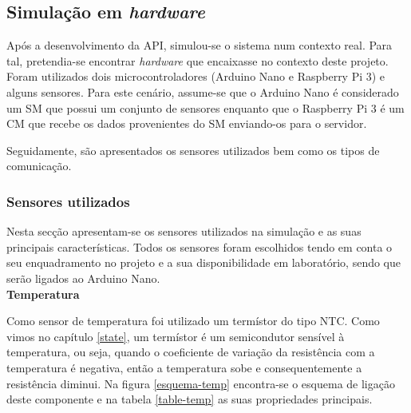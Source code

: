 \newpage
\subsection{Simulação em \textit{hardware}}
\label{arq-hardw}


Após a desenvolvimento da API, simulou-se o sistema num contexto real. Para tal, pretendia-se encontrar \textit{hardware} que encaixasse no contexto deste projeto. Foram utilizados dois microcontroladores (Arduino Nano e Raspberry Pi 3) e alguns sensores. Para este cenário, assume-se que o Arduino Nano é considerado um \acl{SM} que possui um conjunto de sensores enquanto que o Raspberry Pi 3 é um \acl{CM} que recebe os dados provenientes do \acl{SM} enviando-os para o servidor.  

Seguidamente, são apresentados os sensores utilizados bem como os tipos de comunicação. 
 

\subsubsection{Sensores utilizados}

Nesta secção apresentam-se os sensores utilizados na simulação e as suas principais características. Todos os sensores foram escolhidos tendo em conta o seu enquadramento no projeto e a sua disponibilidade em laboratório, sendo que serão ligados ao Arduino Nano. \\


\textbf{Temperatura}


Como sensor de temperatura foi utilizado um termístor do tipo \ac{NTC}. Como vimos no capítulo \ref{state}, um termístor é um semicondutor sensível à temperatura, ou seja, quando o coeficiente de variação da resistência com a temperatura é negativa, então a temperatura sobe e consequentemente a resistência diminui. Na figura \ref{esquema-temp} encontra-se o esquema de ligação deste componente e na tabela \ref{table-temp} as suas propriedades principais\cite{temp-dta}. 


